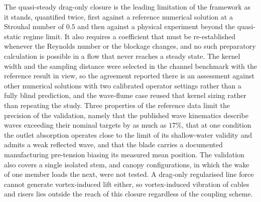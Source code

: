 \noindent
The quasi-steady drag-only closure is the leading limitation of the framework as it stands, quantified twice, first against a reference numerical solution at a Strouhal number of $0.5$ and then against a physical experiment beyond the quasi-static regime limit. It also requires a coefficient that must be re-established whenever the Reynolds number or the blockage changes, and no such preparatory calculation is possible in a flow that never reaches a steady state. The kernel width and the sampling distance were selected in the channel benchmark with the reference result in view, so the agreement reported there is an assessment against other numerical solutions with two calibrated operator settings rather than a fully blind prediction, and the wave-flume case reused that kernel sizing rather than repeating the study. Three properties of the reference data limit the precision of the validation, namely that the published wave kinematics describe waves exceeding their nominal targets by as much as $17\%$, that at one condition the outlet absorption operates close to the limit of its shallow-water validity and admits a weak reflected wave, and that the blade carries a documented manufacturing pre-tension biasing its measured mean position. The validation also covers a single isolated stem, and canopy configurations, in which the wake of one member loads the next, were not tested. A drag-only regularised line force cannot generate vortex-induced lift either, so vortex-induced vibration of cables and risers lies outside the reach of this closure regardless of the coupling scheme.

